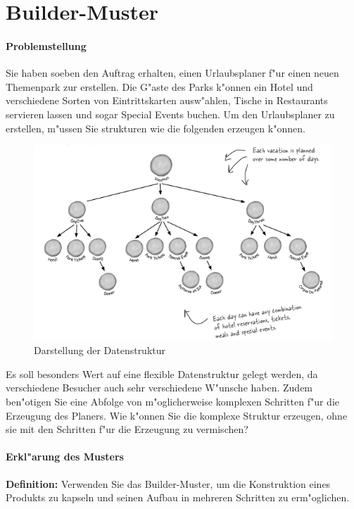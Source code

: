 \section{Builder-Muster}

\paragraph{Problemstellung}
Sie haben soeben den Auftrag erhalten, einen Urlaubsplaner f"ur einen neuen Themenpark zur erstellen. Die G"aste des Parks k"onnen ein Hotel und verschiedene Sorten von Eintrittskarten ausw"ahlen, Tische in Restaurants servieren lassen und sogar Special Events buchen. Um den Urlaubsplaner zu erstellen, m"ussen Sie strukturen wie die folgenden erzeugen k"onnen. 

\begin{figure} [!htb]
	\centering
	\includegraphics[width=.9\linewidth]{builder/img/builder}
	\caption{Darstellung der Datenstruktur}
	\label{fig:builder}
\end{figure}

Es soll besonders Wert auf eine flexible Datenstruktur gelegt werden, da verschiedene Besucher auch sehr verschiedene W"unsche haben. Zudem ben"otigen Sie eine Abfolge von m"oglicherweise komplexen Schritten f"ur die Erzeugung des Planers. Wie k"onnen Sie die komplexe Struktur erzeugen, ohne sie mit den Schritten f"ur die Erzeugung zu vermischen?

\paragraph{Erkl"arung des Musters}
\textbf{Definition:} Verwenden Sie das Builder-Muster, um die Konstruktion eines Produkts zu kapseln und seinen Aufbau in mehreren Schritten zu erm"oglichen.

